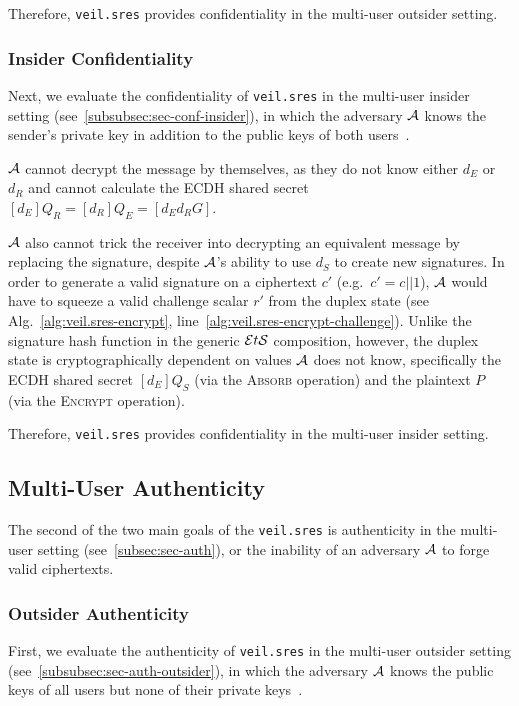 Therefore, \texttt{veil.sres} provides confidentiality in the multi-user outsider setting.

\subsubsection{Insider Confidentiality}

Next, we evaluate the confidentiality of \texttt{veil.sres} in the multi-user insider setting
(see~\ref{subsubsec:sec-conf-insider}), in which the adversary $\mathcal{A}$ knows the sender's private key in addition
to the public keys of both users~\cite[p. 45--46]{baek2010}.

$\mathcal{A}$ cannot decrypt the message by themselves, as they do not know either $d_E$ or $d_R$ and cannot calculate
the ECDH shared secret $[d_E]Q_R=[d_R]Q_E=[d_E{d_R}G]$.

$\mathcal{A}$ also cannot trick the receiver into decrypting an equivalent message by replacing the signature, despite
$\mathcal{A}$'s ability to use $d_S$ to create new signatures.
In order to generate a valid signature on a ciphertext $c'$ (e.g.\ $c'=c||1$), $\mathcal{A}$ would have to squeeze a
valid challenge scalar $r'$ from the duplex state (see Alg.~\ref{alg:veil.sres-encrypt},
line~\ref{alg:veil.sres-encrypt-challenge}).
Unlike the signature hash function in the generic $\mathcal{E}t\mathcal{S}$ composition, however, the duplex state is cryptographically
dependent on values $\mathcal{A}$ does not know, specifically the ECDH shared secret $[d_E]Q_S$ (via the \textsc{Absorb}
operation) and the plaintext $P$ (via the \textsc{Encrypt} operation).

Therefore, \texttt{veil.sres} provides confidentiality in the multi-user insider setting.

\subsection{Multi-User Authenticity}\label{subsec:veil.sres-auth}

The second of the two main goals of the \texttt{veil.sres} is authenticity in the multi-user setting
(see~\ref{subsec:sec-auth}), or the inability of an adversary $\mathcal{A}$ to forge valid ciphertexts.

\subsubsection{Outsider Authenticity}

First, we evaluate the authenticity of \texttt{veil.sres} in the multi-user outsider setting
(see~\ref{subsubsec:sec-auth-outsider}), in which the adversary $\mathcal{A}$ knows the public keys of all users but none
of their private keys~\cite[p. 47]{baek2010}.


